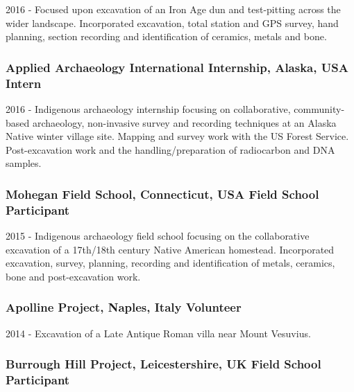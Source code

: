 \documentclass[11pt,a4paper]{article}
\begin{document}
2016 - Focused upon excavation of an Iron Age dun and test-pitting
across the wider landscape. Incorporated excavation, total station and
GPS survey, hand planning, section recording and identification of
ceramics, metals and bone.

\subsubsection{\texorpdfstring{\textbf{Applied Archaeology International
Internship, Alaska, USA}
Intern}{Applied Archaeology International Internship, Alaska, USA Intern}}\label{applied-archaeology-international-internship-alaska-usa-intern}

2016 - Indigenous archaeology internship focusing on collaborative,
community-based archaeology, non-invasive survey and recording
techniques at an Alaska Native winter village site. Mapping and survey
work with the US Forest Service. Post-excavation work and the
handling/preparation of radiocarbon and DNA samples.

\subsubsection{\texorpdfstring{\textbf{Mohegan Field School,
Connecticut, USA} Field School
Participant}{Mohegan Field School, Connecticut, USA Field School Participant}}\label{mohegan-field-school-connecticut-usa-field-school-participant}

2015 - Indigenous archaeology field school focusing on the collaborative
excavation of a 17th/18th century Native American homestead.
Incorporated excavation, survey, planning, recording and identification
of metals, ceramics, bone and post-excavation work.

\subsubsection{\texorpdfstring{\textbf{Apolline Project, Naples, Italy}
Volunteer}{Apolline Project, Naples, Italy Volunteer}}\label{apolline-project-naples-italy-volunteer}

2014 - Excavation of a Late Antique Roman villa near Mount Vesuvius.

\subsubsection{\texorpdfstring{\textbf{Burrough Hill Project,
Leicestershire, UK} Field School
Participant}{Burrough Hill Project, Leicestershire, UK Field School Participant}}\label{burrough-hill-project-leicestershire-uk-field-school-participant}
\end{document}
